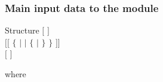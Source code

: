 
\vskip 0.2cm
\subsubsection{Main input data to the  module}\label{sect:mccmain}

\noindent

\begin{DataStructure}{Structure }
$[$   $]$\\
$[[$   $\{$   $|$   $|$ $\{$  $|$  $\}$  $\}$ $]]$ \\
$[$   $]$\\
\moc{;}
\end{DataStructure}

\noindent where

